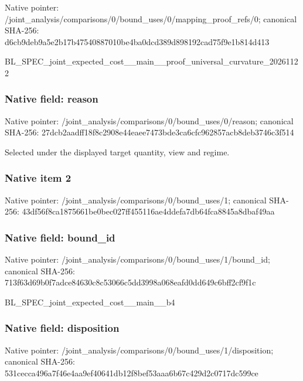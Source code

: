 \documentclass[10pt,a4paper]{article}
\begin{document}
Native pointer: /joint\_analysis/comparis\allowbreak{}ons/0/bound\_uses/0/mappi\allowbreak{}ng\_proof\_refs/0; canonical SHA-256: d6cb9deb9a5e2b17b4754088\allowbreak{}7010be4ba0dcd389d898192c\allowbreak{}ad75f9e1b814d413


BL\_SPEC\_joint\_expected\_c\allowbreak{}ost\_\_main\_\_proof\_univers\allowbreak{}al\_curvature\_20261122


\subsubsection{Native field: reason}


Native pointer: /joint\_analysis/comparis\allowbreak{}ons/0/bound\_uses/0/reaso\allowbreak{}n; canonical SHA-256: 27dcb2aadff18f8c2908e44e\allowbreak{}aee7473bde3ca6cfc962857a\allowbreak{}cb8deb3746c3f514


Selected under the displayed target quantity, view and regime.


\subsubsection{Native item 2}


Native pointer: /joint\_analysis/comparis\allowbreak{}ons/0/bound\_uses/1; canonical SHA-256: 43df56f8ca1875661be0bec0\allowbreak{}27ff455116ae4ddefa7db64f\allowbreak{}ca8845a8dbaf49aa



\subsubsection{Native field: bound\_id}


Native pointer: /joint\_analysis/comparis\allowbreak{}ons/0/bound\_uses/1/bound\allowbreak{}\_id; canonical SHA-256: 713f63d69b0f7adce84630c8\allowbreak{}c53066c5dd3998a068eafd0d\allowbreak{}d649c6bff2cf9f1c


BL\_SPEC\_joint\_expected\_cost\_\_main\_\_b4


\subsubsection{Native field: disposition}


Native pointer: /joint\_analysis/comparis\allowbreak{}ons/0/bound\_uses/1/dispo\allowbreak{}sition; canonical SHA-256: 531cecca496a7f46e4aa9ef4\allowbreak{}0641db12f8bef53aaa6b67c4\allowbreak{}29d2c0717dc599ce
\end{document}
